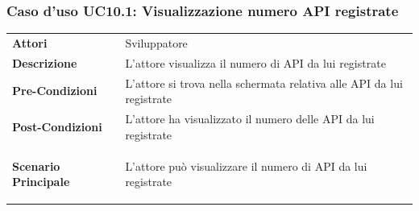 \subsubsection{Caso d'uso UC10.1: Visualizzazione numero API registrate}
\label{UC10_1}

\begin{minipage}{\linewidth}
	\begin{tabular}{ l | p{11cm}}
		\hline
		\rowcolor{Gray}
		\multicolumn{2}{c}{UC10.1 - Visualizzazione numero API registrate} \\
		\hline
		\textbf{Attori} & Sviluppatore \\
		\textbf{Descrizione} & L'attore visualizza il numero di API da lui registrate \\
		\textbf{Pre-Condizioni} & L'attore si trova nella schermata relativa alle API da lui registrate \\
		\textbf{Post-Condizioni} & L'attore ha visualizzato il numero delle API da lui registrate \\
		\textbf{Scenario Principale} & 
		\begin{enumerate*}[label=(\arabic*.),itemjoin={\newline}]
			\item L'attore può visualizzare il numero di API da lui registrate
		\end{enumerate*}\\
	\end{tabular}
\end{minipage}

\newpage

